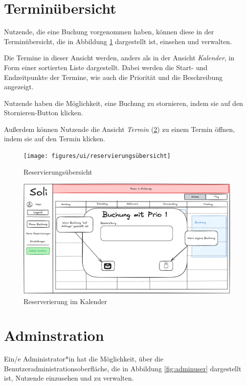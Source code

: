 \section{Terminübersicht}
Nutzende, die eine Buchung vorgenommen haben, können diese in der Terminübersicht,
die in Abbildung \ref{fig:overview} dargestellt ist, einsehen und verwalten.

Die Termine in dieser Ansicht werden, anders als in der Ansicht \textit{Kalender}, in Form einer sortierten Liste dargestellt.
Dabei werden die Start- und Endzeitpunkte der Termine, wie auch die Priorität und die Beschreibung angezeigt.

Nutzende haben die Möglichkeit, eine Buchung zu stornieren, indem sie auf den Stornieren-Button klicken.

Außerdem können Nutzende die Ansicht \textit{Termin} (\ref{fig:calendarviewbooking}) zu einem Termin öffnen, indem sie auf den Termin klicken.

\begin{figure}[ht]
    \texttt{[image: figures/ui/reservierungsübersicht]}
    \caption{Reservierungsübersicht}
    \label{fig:overview}
\end{figure}
\begin{figure}
    \centering
    \includegraphics[width=\textwidth]{figures/ui/reservierunginkalendar}
    \caption{Reserverierung im Kalender}
    \label{fig:calendarviewbooking}
\end{figure}
\clearpage

\section{Adminstration}
Ein/e Administrator*in hat die Möglichkeit, über die Benutzeradministrationsoberfläche, die in Abbildung \ref{fig:adminuser} dargestellt ist, Nutzende einzusehen und zu verwalten.

